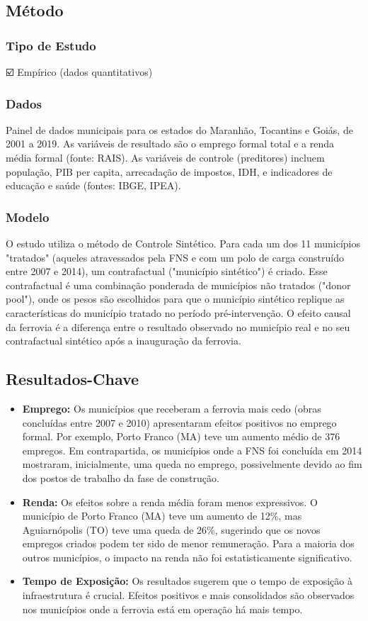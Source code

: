 \documentclass[12pt]{article}
\begin{document}
\subsection*{Método}

\subsubsection*{Tipo de Estudo}
☑️ Empírico (dados quantitativos)

\subsubsection*{Dados}
Painel de dados municipais para os estados do Maranhão, Tocantins e Goiás, de 2001 a 2019. As variáveis de resultado são o emprego formal total e a renda média formal (fonte: RAIS). As variáveis de controle (preditores) incluem população, PIB per capita, arrecadação de impostos, IDH, e indicadores de educação e saúde (fontes: IBGE, IPEA).

\subsubsection*{Modelo}
O estudo utiliza o método de Controle Sintético. Para cada um dos 11 municípios "tratados" (aqueles atravessados pela FNS e com um polo de carga construído entre 2007 e 2014), um contrafactual ("município sintético") é criado. Esse contrafactual é uma combinação ponderada de municípios não tratados ("donor pool"), onde os pesos são escolhidos para que o município sintético replique as características do município tratado no período pré-intervenção. O efeito causal da ferrovia é a diferença entre o resultado observado no município real e no seu contrafactual sintético após a inauguração da ferrovia.

\subsection*{Resultados-Chave}
\begin{itemize}
    \item \textbf{Emprego:} Os municípios que receberam a ferrovia mais cedo (obras concluídas entre 2007 e 2010) apresentaram efeitos positivos no emprego formal. Por exemplo, Porto Franco (MA) teve um aumento médio de 376 empregos. Em contrapartida, os municípios onde a FNS foi concluída em 2014 mostraram, inicialmente, uma queda no emprego, possivelmente devido ao fim dos postos de trabalho da fase de construção.
    \item \textbf{Renda:} Os efeitos sobre a renda média foram menos expressivos. O município de Porto Franco (MA) teve um aumento de 12\%, mas Aguiarnópolis (TO) teve uma queda de 26\%, sugerindo que os novos empregos criados podem ter sido de menor remuneração. Para a maioria dos outros municípios, o impacto na renda não foi estatisticamente significativo.
    \item \textbf{Tempo de Exposição:} Os resultados sugerem que o tempo de exposição à infraestrutura é crucial. Efeitos positivos e mais consolidados são observados nos municípios onde a ferrovia está em operação há mais tempo.
\end{itemize}
\end{document}
